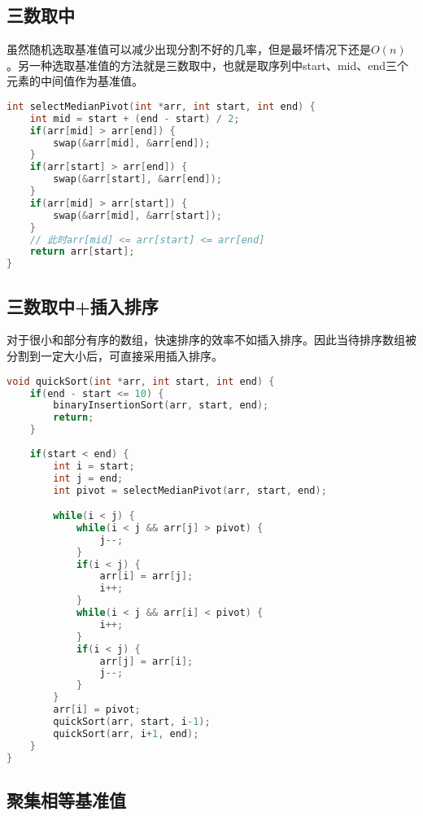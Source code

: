 \subsection{三数取中}

虽然随机选取基准值可以减少出现分割不好的几率，但是最坏情况下还是$ O(n) $。另一种选取基准值的方法就是三数取中，也就是取序列中start、mid、end三个元素的中间值作为基准值。 \\


\begin{lstlisting}[language=C]
int selectMedianPivot(int *arr, int start, int end) {
    int mid = start + (end - start) / 2;
    if(arr[mid] > arr[end]) {
        swap(&arr[mid], &arr[end]);
    }
    if(arr[start] > arr[end]) {
        swap(&arr[start], &arr[end]);
    }
    if(arr[mid] > arr[start]) {
        swap(&arr[mid], &arr[start]);
    }
    // 此时arr[mid] <= arr[start] <= arr[end]
    return arr[start];
}
\end{lstlisting}

\subsection{三数取中+插入排序}

对于很小和部分有序的数组，快速排序的效率不如插入排序。因此当待排序数组被分割到一定大小后，可直接采用插入排序。 \\


\begin{lstlisting}[language=C]
void quickSort(int *arr, int start, int end) {
    if(end - start <= 10) {
        binaryInsertionSort(arr, start, end);
        return;
    }
    
    if(start < end) {
        int i = start;
        int j = end;
        int pivot = selectMedianPivot(arr, start, end);

        while(i < j) {
            while(i < j && arr[j] > pivot) {
                j--;
            }
            if(i < j) {
                arr[i] = arr[j];
                i++;
            }
            while(i < j && arr[i] < pivot) {
                i++;
            }
            if(i < j) {
                arr[j] = arr[i];
                j--;
            }
        }
        arr[i] = pivot;
        quickSort(arr, start, i-1);
        quickSort(arr, i+1, end);
    } 
}
\end{lstlisting}

\subsection{聚集相等基准值}

